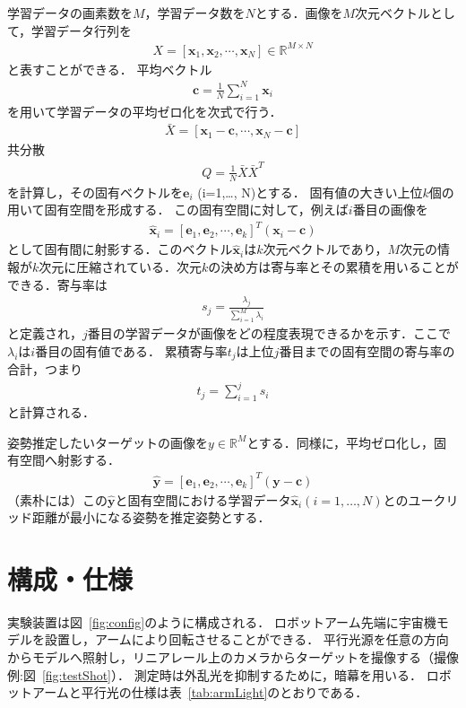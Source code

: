 \documentclass{article}
\begin{document}
学習データの画素数を$M$，学習データ数を$N$とする．画像を$M$次元ベクトルとして，学習データ行列を
\begin{align}
X = [\bm{x}_{1},\bm{x}_{2},\cdots,\bm{x}_{N}] \in \mathbb{R}^{M\times N}
\end{align}
と表すことができる．
平均ベクトル
\begin{align}
\bm{c}  = \frac{1}{N}\sum_{i=1}^{N} \bm{x}_{i}
\end{align}
を用いて学習データの平均ゼロ化を次式で行う．
\begin{align}
\bar{X} = [\bm{x}_{1}-\bm{c},\cdots, \bm{x}_{N}-\bm{c}]
\end{align}
共分散
\begin{align}
Q = \frac{1}{N}\bar{X}\bar{X}^{T}
\end{align}
を計算し，その固有ベクトルを$\bm{e}_{i}$ (i=1,\dots, N)とする．
固有値の大きい上位$k$個の用いて固有空間を形成する．
この固有空間に対して，例えば$i$番目の画像を
\begin{align}
\hat{\bm{x}}_{i} = [\bm{e}_{1},\bm{e}_{2},\cdots, \bm{e}_{k}]^{T} (\bm{x}_{i}- \bm{c})
\end{align}
として固有間に射影する．このベクトル$\hat{\bm{x}}_{i}$は$k$次元ベクトルであり，$M$次元の情報が$k$次元に圧縮されている．次元$k$の決め方は寄与率とその累積を用いることができる．寄与率は
\begin{align}
s_{j} = \frac{\lambda_{j}}{\sum_{i=1}^{M}\lambda_{i}}
\end{align}
と定義され，$j$番目の学習データが画像をどの程度表現できるかを示す．ここで$\lambda_{i}$は$i$番目の固有値である．
累積寄与率$t_{j}$は上位$j$番目までの固有空間の寄与率の合計，つまり
\begin{align}
t_{j} = \sum_{i=1}^{j}s_{i}
\end{align}
と計算される．

姿勢推定したいターゲットの画像を$y\in \mathbb{R}^{M}$とする．同様に，平均ゼロ化し，固有空間へ射影する．
\begin{align}
\hat{\bm{y}} = [\bm{e}_{1},\bm{e}_{2},\cdots, \bm{e}_{k}]^{T} (\bm{y}- \bm{c})
\end{align}
（素朴には）この$\hat{\bm{y}}$と固有空間における学習データ$\hat{\bm{x}}_{i}  (i=1,\dots, N)$とのユークリッド距離が最小になる姿勢を推定姿勢とする．


\section{構成・仕様}
実験装置は図~\ref{fig:config}のように構成される．
ロボットアーム先端に宇宙機モデルを設置し，アームにより回転させることができる．
平行光源を任意の方向からモデルへ照射し，リニアレール上のカメラからターゲットを撮像する（撮像例:図~\ref{fig:testShot}）．
測定時は外乱光を抑制するために，暗幕を用いる．
ロボットアームと平行光の仕様は表~\ref{tab:armLight}のとおりである．
\end{document}
